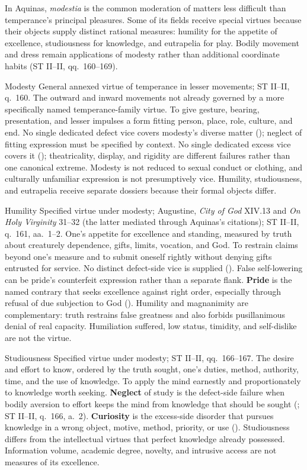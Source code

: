 
In Aquinas, \emph{modestia} is the common moderation of matters less difficult than temperance's principal pleasures. Some of its fields receive special virtues because their objects supply distinct rational measures: humility for the appetite of excellence, studiousness for knowledge, and eutrapelia for play. Bodily movement and dress remain applications of modesty rather than additional coordinate habits (ST II--II, qq.~160--169).

\virtuedossier
  {Modesty}
  {General annexed virtue of temperance in lesser movements; ST II--II, q.~160.}
  {The outward and inward movements not already governed by a more specifically named temperance-family virtue.}
  {To give gesture, bearing, presentation, and lesser impulses a form fitting person, place, role, culture, and end.}
  {No single dedicated defect vice covers modesty's diverse matter (); neglect of fitting expression must be specified by context.}
  {No single dedicated excess vice covers it (); theatricality, display, and rigidity are different failures rather than one canonical extreme.}
  {Modesty is not reduced to sexual conduct or clothing, and culturally unfamiliar expression is not presumptively vice. Humility, studiousness, and eutrapelia receive separate dossiers because their formal objects differ.}

\virtuedossier
  {Humility}
  {Specified virtue under modesty; Augustine, \emph{City of God} XIV.13 and \emph{On Holy Virginity} 31--32 (the latter mediated through Aquinas's citations); ST II--II, q.~161, aa.~1--2.}
  {One's appetite for excellence and standing, measured by truth about creaturely dependence, gifts, limits, vocation, and God.}
  {To restrain claims beyond one's measure and to submit oneself rightly without denying gifts entrusted for service.}
  {No distinct defect-side vice is supplied (). False self-lowering can be pride's counterfeit expression rather than a separate flank.}
  {\textbf{Pride} is the named contrary that seeks excellence against right order, especially through refusal of due subjection to God ().}
  {Humility and magnanimity are complementary: truth restrains false greatness and also forbids pusillanimous denial of real capacity. Humiliation suffered, low status, timidity, and self-dislike are not the virtue.}

\virtuedossier
  {Studiousness}
  {Specified virtue under modesty; ST II--II, qq.~166--167.}
  {The desire and effort to know, ordered by the truth sought, one's duties, method, authority, time, and the use of knowledge.}
  {To apply the mind earnestly and proportionately to knowledge worth seeking.}
  {\textbf{Neglect} of study is the defect-side failure when bodily aversion to effort keeps the mind from knowledge that should be sought (; ST II--II, q.~166, a.~2).}
  {\textbf{Curiosity} is the excess-side disorder that pursues knowledge in a wrong object, motive, method, priority, or use ().}
  {Studiousness differs from the intellectual virtues that perfect knowledge already possessed. Information volume, academic degree, novelty, and intrusive access are not measures of its excellence.}

